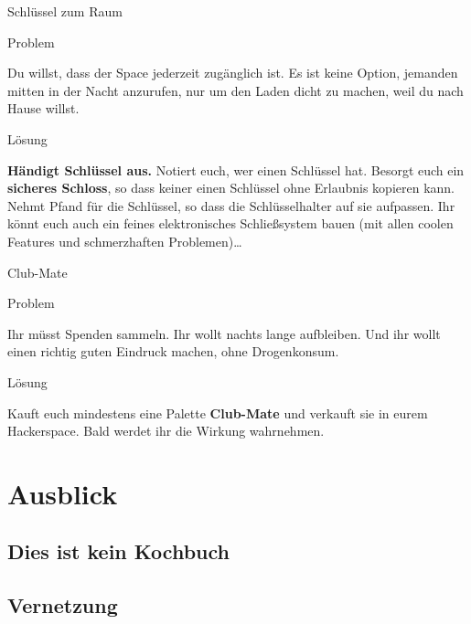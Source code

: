 \documentclass{beamer}
\newcommand{\pattern}[2]{
  \begin{alertblock}{Problem}
    #1
  \end{alertblock}
  \pause
  \begin{exampleblock}{Lösung}
    #2
  \end{exampleblock}
}
\begin{document}
  \begin{frame}{Schlüssel zum Raum}
    \pattern{
      Du willst, dass der Space jederzeit zugänglich ist. Es ist keine Option,
      jemanden mitten in der Nacht anzurufen, nur um den Laden dicht zu machen,
      weil du nach Hause willst.
    }{
      \textbf{Händigt Schlüssel aus.} Notiert euch, wer einen Schlüssel hat.
      Besorgt euch ein \textbf{sicheres Schloss}, so dass keiner einen Schlüssel
      ohne Erlaubnis kopieren kann. Nehmt Pfand für die Schlüssel, so dass die
      Schlüsselhalter auf sie aufpassen. Ihr könnt euch auch ein feines
      elektronisches Schließsystem bauen (mit allen coolen Features und
      schmerzhaften Problemen)…
    }
  \end{frame}

  \begin{frame}{Club-Mate}
    \pattern{
      Ihr müsst Spenden sammeln. Ihr wollt nachts lange aufbleiben. Und ihr
      wollt einen richtig guten Eindruck machen, ohne Drogenkonsum.
    }{
      Kauft euch mindestens eine Palette \textbf{Club-Mate} und verkauft sie in
      eurem Hackerspace. Bald werdet ihr die Wirkung wahrnehmen.
    }
  \end{frame}

  \section{Ausblick}

  \subsection{Dies ist kein Kochbuch}

  \subsection{Vernetzung}
\end{document}
